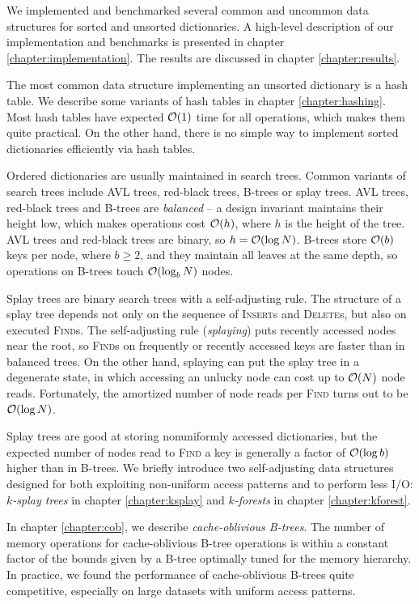 We implemented and benchmarked several common and uncommon data structures
for sorted and unsorted dictionaries. A high-level description of our
implementation and benchmarks is presented in chapter
\ref{chapter:implementation}. The results are discussed in
chapter \ref{chapter:results}.

The most common data structure implementing an unsorted dictionary is a hash
table. We describe some variants of hash tables in chapter \ref{chapter:hashing}.
Most hash tables have expected $\mathcal{O}(1)$ time for all operations, which
makes them quite practical. On the other hand, there is no simple way to
implement sorted dictionaries efficiently via hash tables.

Ordered dictionaries are usually maintained in search trees. Common variants
of search trees include AVL trees, red-black trees, B-trees or splay trees.
AVL trees, red-black trees and B-trees are \emph{balanced} -- a design
invariant maintains their height low, which makes operations cost $\mathcal{O}(h)$, where
$h$ is the height of the tree. AVL trees and red-black trees are binary,
so $h=\mathcal{O}(\log N)$. B-trees store $\mathcal{O}(b)$ keys per node, where $b\geq 2$,
and they maintain all leaves at the same depth, so operations on B-trees touch
$\mathcal{O}(\log_b N)$ nodes.

Splay trees are binary search trees with a self-adjusting rule.
The structure of a splay tree depends not only on the sequence of
\textsc{Insert}s and \textsc{Delete}s, but also on executed \textsc{Find}s.
The self-adjusting rule (\emph{splaying}) puts recently accessed nodes
near the root, so \textsc{Find}s on frequently or recently accessed keys
are faster than in balanced trees. On the other hand, splaying can put
the splay tree in a degenerate state, in which accessing an unlucky node can
cost up to $\mathcal{O}(N)$ node reads. Fortunately, the amortized number of node
reads per \textsc{Find} turns out to be $\mathcal{O}(\log N)$.

Splay trees are good at storing nonuniformly accessed dictionaries, but
the expected number of nodes read to \textsc{Find} a key is generally a factor
of $\mathcal{O}(\log b)$ higher than in B-trees. We briefly introduce two
self-adjusting data structures designed for both exploiting non-uniform
access patterns and to perform less I/O: \emph{$k$-splay trees} in chapter
\ref{chapter:ksplay} and \emph{$k$-forests} in chapter \ref{chapter:kforest}.

In chapter \ref{chapter:cob}, we describe \emph{cache-oblivious B-trees}.
The number of memory operations for cache-oblivious B-tree operations
is within a constant factor of the bounds given by a B-tree optimally tuned
for the memory hierarchy. In practice, we found the performance of
cache-oblivious B-trees quite competitive, especially on large datasets
with uniform access patterns.

